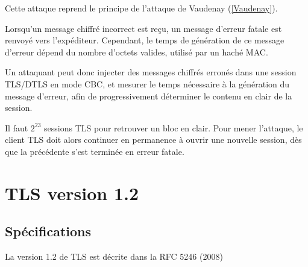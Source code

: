 \documentclass[a4paper,11pt,french]{article}
\begin{document}
Cette attaque reprend le principe de l'attaque de Vaudenay (\ref{Vaudenay}).

 
Lorsqu'un message chiffré incorrect est reçu, un message d'erreur fatale est renvoyé vers l'expéditeur. Cependant, le temps de génération de ce message d'erreur dépend du nombre d'octets valides, utilisé par un haché MAC.

Un attaquant peut donc injecter des messages chiffrés erronés dans une session TLS/DTLS en mode CBC, et mesurer le temps nécessaire à la génération du message d'erreur, afin de progressivement déterminer le contenu en clair de la session.

Il faut $2^{23}$ sessions TLS pour retrouver un bloc en clair. Pour mener l'attaque, le client TLS doit alors continuer en permanence à ouvrir une nouvelle session, dès que la précédente s'est terminée en erreur fatale.


\pagebreak
\section{TLS version 1.2}
\subsection{Spécifications}

La version 1.2 de TLS est décrite dans la RFC 5246 (2008)
\end{document}
